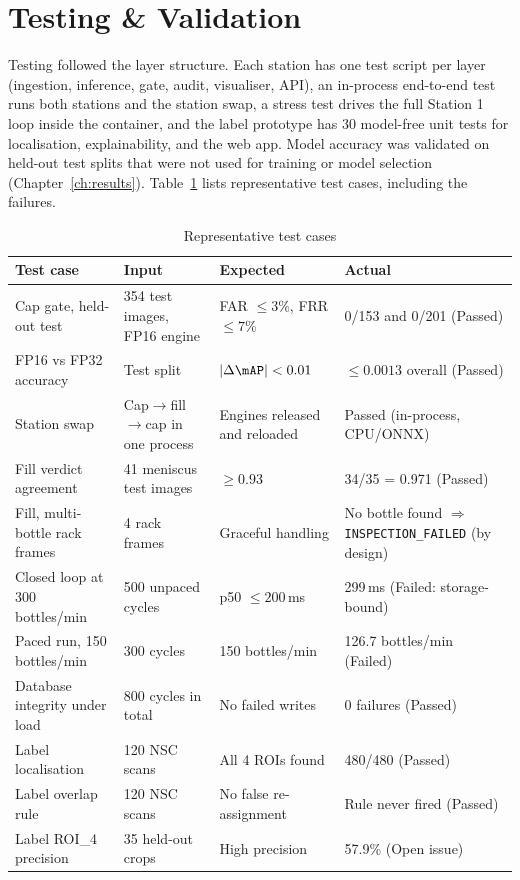 \section{Testing \& Validation}
\label{sec:testing-validation}

Testing followed the layer structure. Each station has one test script per layer (ingestion, inference, gate, audit, visualiser, API), an in-process end-to-end test runs both stations and the station swap, a stress test drives the full Station 1 loop inside the container, and the label prototype has 30 model-free unit tests for localisation, explainability, and the web app. Model accuracy was validated on held-out test splits that were not used for training or model selection (Chapter~\ref{ch:results}). Table~\ref{tab:test-results} lists representative test cases, including the failures.

\begin{table}[htbp]
\centering
\caption{Representative test cases}
\label{tab:test-results}
\footnotesize
\begin{tabularx}{\textwidth}{|p{3.4cm}|p{3.2cm}|p{2.8cm}|X|}
\hline
\textbf{Test case} & \textbf{Input} & \textbf{Expected} & \textbf{Actual} \\ \hline
Cap gate, held-out test & 354 test images, FP16 engine & FAR $\leq3\%$, FRR $\leq7\%$ & 0/153 and 0/201 (Passed) \\ \hline
FP16 vs FP32 accuracy & Test split & $|\Delta\mAP|<0.01$ & $\leq0.0013$ overall (Passed) \\ \hline
Station swap & Cap$\rightarrow$fill$\rightarrow$cap in one process & Engines released and reloaded & Passed (in-process, CPU/ONNX) \\ \hline
Fill verdict agreement & 41 meniscus test images & $\geq0.93$ & 34/35 = 0.971 (Passed) \\ \hline
Fill, multi-bottle rack frames & 4 rack frames & Graceful handling & No bottle found $\Rightarrow$ \texttt{INSPECTION\_FAILED} (by design) \\ \hline
Closed loop at 300 bottles/min & 500 unpaced cycles & p50 $\leq200$\,ms & 299\,ms (Failed: storage-bound) \\ \hline
Paced run, 150 bottles/min & 300 cycles & 150 bottles/min & 126.7 bottles/min (Failed) \\ \hline
Database integrity under load & 800 cycles in total & No failed writes & 0 failures (Passed) \\ \hline
Label localisation & 120 NSC scans & All 4 ROIs found & 480/480 (Passed) \\ \hline
Label overlap rule & 120 NSC scans & No false re-assignment & Rule never fired (Passed) \\ \hline
Label ROI\_4 precision & 35 held-out crops & High precision & 57.9\% (Open issue) \\ \hline
\end{tabularx}
\end{table}
